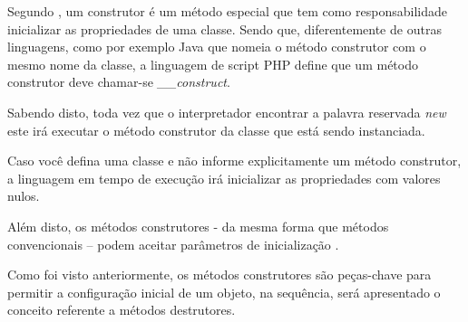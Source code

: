 Segundo , um construtor é um método especial que tem
como responsabilidade inicializar as propriedades de uma classe. Sendo que,
diferentemente de outras linguagens, como por exemplo Java que nomeia o  método
construtor com o mesmo nome da classe, a linguagem de script \acs{PHP} define que um
método construtor deve chamar-se \textit{\_\_construct}.

Sabendo disto, toda vez que o interpretador encontrar a palavra reservada
\textit{new} este irá executar o método construtor da classe que está sendo
instanciada.

Caso você defina uma classe e não informe explicitamente um método construtor, a
linguagem em tempo de execução irá inicializar as propriedades com valores nulos.

Além disto, os métodos construtores - da mesma forma que métodos convencionais –
podem aceitar parâmetros de inicialização \cite{learningJava}.

Como foi visto anteriormente, os métodos construtores são peças-chave para
permitir a configuração inicial de um objeto, na sequência, será apresentado o conceito referente a
métodos destrutores.
